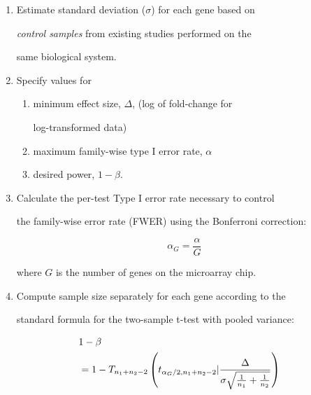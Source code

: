 \documentclass[12pt]{article}
\begin{document}
\begin{enumerate}

\item{Estimate standard deviation ($\sigma$) for each gene based on

    \emph{control samples} from existing studies performed on the

    same biological system.}



\item{Specify values for

    \begin{enumerate}

    \item minimum effect size, $\Delta$, (log of fold-change for

          log-transformed data)

    \item maximum family-wise type I error rate, $\alpha$

    \item desired power, $1 - \beta$.

    \end{enumerate}

  }



\item{Calculate the per-test Type I error rate necessary to control

      the family-wise error rate (FWER) using the Bonferroni correction:}

\begin{equation}

  \alpha_G = \frac{\alpha}{G}

\end{equation}

%

where $G$ is the number of genes on the microarray chip.



\item{Compute sample size separately for each gene according to the

    standard formula for the two-sample t-test with pooled variance:}

  \begin{eqnarray}

    \lefteqn{1-\beta} \nonumber \\

    &= 1-T_{n_1+n_2-2} \left( t_{\alpha_G/2,n_1+n_2-2} | \frac{\Delta}{\sigma \sqrt{\frac{1}{n_1} + \frac{1}{n_2}}}\right) \nonumber \\


\end{eqnarray}
\end{enumerate}
\end{document}
